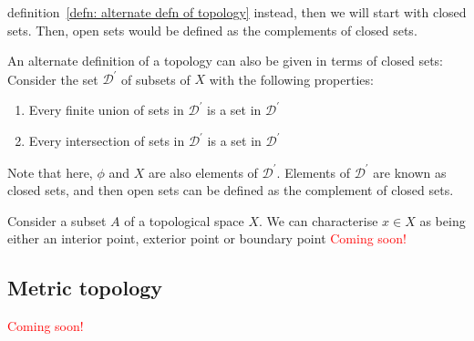     definition~\ref{defn: alternate defn of topology} instead, then we will
    start with closed sets. Then, open sets would be defined as the
    complements of closed sets.
    \begin{definition}
      \label{defn: alternate defn of topology}
      An alternate definition of a topology can also be given in terms of
      closed sets: Consider the set $\mathcal{D}^\prime$ of subsets of $X$ with
      the following properties:
      \begin{enumerate}
        \item{Every finite union of sets in $\mathcal{D}^\prime$ is a set in
        $\mathcal{D}^\prime$}
        \item{Every intersection of sets in $\mathcal{D}^\prime$ is a set in
        $\mathcal{D}^\prime$}
      \end{enumerate}
      Note that here, $\phi$ and $X$ are also elements of
      $\mathcal{D}^\prime$. Elements of $ \mathcal{D}^\prime$ are known as
      closed sets, and then open sets can be defined as the complement of
      closed sets.
    \end{definition}
    \begin{definition}
      Consider a subset $A$ of a topological space $X$. We can characterise
      $x \in X$ as being either an interior point, exterior point or boundary
      point
      \textcolor{red}{Coming soon!}
    \end{definition}
    \subsection{Metric topology}
      \textcolor{red}{Coming soon!}
    